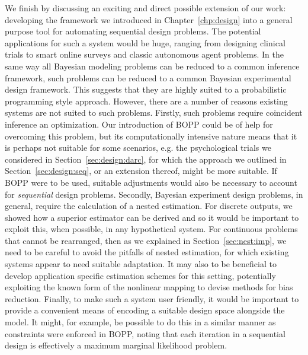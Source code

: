 We finish by discussing an exciting and direct possible extension of our work: developing the framework we introduced 
in Chapter~\ref{chp:design} into a general purpose tool for automating sequential design problems.
The potential applications for such a system would be huge,  ranging from designing clinical trials to
smart online surveys and classic autonomous agent problems.  In  the same way all Bayesian modeling
problems can be reduced to a common inference framework, such problems can be reduced to a
common Bayesian experimental design framework. This suggests that they are highly suited to a
probabilistic programming style approach.  However, there are a number of reasons existing systems
are not suited to such problems.  Firstly, such problems require coincident inference 
an optimization.  Our introduction of BOPP could be of help for overcoming this problem,
but its computationally intensive nature means that it is perhaps not suitable for
some scenarios, e.g. the psychological trials we considered in Section~\ref{sec:design:darc},
for which the approach we outlined in Section~\ref{sec:design:seq}, or an extension thereof,
might be more suitable.  If BOPP were to be used, suitable adjustments would also be necessary
to account for \emph{sequential} design problems.
Secondly, Bayesian experiment design problems, in general, require the calculation of a nested 
estimation.  For discrete outputs, we showed how a superior estimator can be derived and so
it would be important to exploit this, when possible, in any hypothetical system.  For continuous problems that
cannot be rearranged, then as we explained in Section~\ref{sec:nest:imp}, we need to be careful
to avoid the pitfalls of nested estimation, for which existing systems appear to need suitable
adaptation.  It may also to be beneficial to develop application specific estimation schemes
for this setting, potentially exploiting the known form of the nonlinear mapping to
devise methods for bias reduction.  Finally, to make such a system user friendly, it would
be important to provide a convenient means of encoding a suitable design space alongside the
model.  It might, for example, be possible to do this in a similar manner as constraints were enforced
in BOPP, noting that each iteration in a sequential design is effectively a maximum marginal likelihood
problem.

